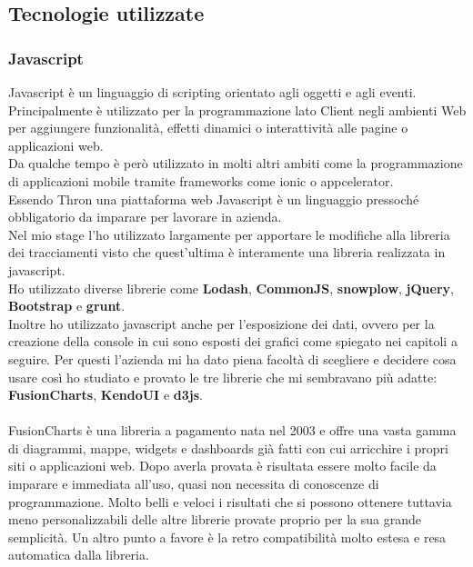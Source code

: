 \documentclass[a4paper, 12pt, twoside, openright]{book}
\begin{document}
\subsection{Tecnologie utilizzate}

\subsubsection{Javascript}
Javascript è un linguaggio di scripting orientato agli oggetti e agli eventi. Principalmente è utilizzato per la programmazione lato Client negli ambienti Web per aggiungere funzionalità, effetti dinamici o interattività alle pagine o applicazioni web.\\
Da qualche tempo è però utilizzato in molti altri ambiti come la programmazione di applicazioni mobile tramite frameworks come ionic o appcelerator.\\
Essendo Thron una piattaforma web Javascript è un linguaggio pressoché obbligatorio da imparare per lavorare in azienda.\\
Nel mio stage l'ho utilizzato largamente per apportare le modifiche alla libreria dei tracciamenti visto che quest'ultima è interamente una libreria realizzata in javascript.\\ %
Ho utilizzato diverse librerie come \textbf{Lodash}, \textbf{CommonJS}, \textbf{snowplow}, 	\textbf{jQuery}, \textbf{Bootstrap} e \textbf{grunt}.\\
Inoltre ho utilizzato javascript anche per l'esposizione dei dati, ovvero per la creazione della console in cui sono esposti dei grafici come spiegato nei capitoli a seguire. Per questi l'azienda mi ha dato piena facoltà di scegliere e decidere cosa usare così ho studiato e provato le tre librerie che mi sembravano più adatte: \textbf{FusionCharts}, \textbf{KendoUI} e \textbf{d3js}.\\ \\
FusionCharts è una libreria a pagamento nata nel 2003 e offre una vasta gamma di diagrammi, mappe, widgets e dashboards già fatti con cui arricchire i propri siti o applicazioni web. Dopo averla provata è risultata essere molto facile da imparare e immediata all'uso, quasi non necessita di conoscenze di programmazione. Molto belli e veloci i risultati che si possono ottenere tuttavia meno personalizzabili delle altre librerie provate proprio per la sua grande semplicità. Un altro punto a favore è la retro compatibilità molto estesa e resa automatica dalla libreria.\\
\end{document}
